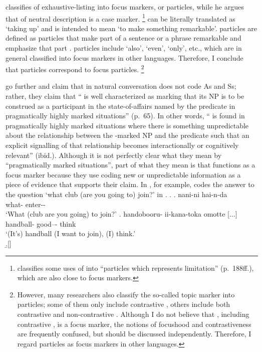  classifies  of exhaustive-listing into focus markers, or  particles,
while he argues that  of neutral description is a case marker.%
 \footnote{
  classifies some uses of  into ``particles which represents limitation'' (p.~188ff.),
 which are also close to focus markers.
 }
 can be literally translated as `taking up'
and is intended to mean `to make something remarkable'.
 particles are defined as
particles that make part of a sentence or a phrase remarkable and emphasize that part \cite[178]{miyata48}.
 particles include  `also',  `even',
 `only', etc.,
which are in general classified into focus markers in other languages.
Therefore, I conclude that  particles correspond to
focus particles.%
 \footnote{
 However, many researchers also classify the so-called topic marker 
  into  particles;
 some of them only include contrastive   \cite{okutsu74,okutsu86,numata86},
 others include both contrastive and non-contrastive 
 \cite{miyata48,suzuki72,teramura81,noda95}.
 Although I do not believe that , including contrastive , is a focus marker,
 the notions of focushood and contrastiveness are frequently confused,
 but should be discussed independently.
 Therefore, I regard  particles as focus markers
 in other languages.}

 go further and claim that
 in natural conversation does not code As and Ss;
rather, they claim that
`` is well characterized as marking that its NP is to be construed as a participant in the state-of-affairs named by the predicate in pragmatically highly marked situations'' (p.~65).
In other words,
`` is found in pragmatically highly marked situations where
there is something unpredictable about the relationship between
the -marked NP and the predicate such that
an explicit signalling of that relationship becomes interactionally or cognitively relevant'' (ibid.).
Although it is not perfectly clear what they mean by
``pragmatically marked situations'',
part of what they mean is that
 functions as a focus marker
because they use  coding new or unpredictable information
as a piece of evidence that supports their claim.
In \Next[b], for example,
 codes the answer to the question
`what club (are you going to) join?' in \Next[a].
%
\ex.
 \ag. nani-ni hai-n-da \\
      what- enter-- \\
      `What (club are you going) to join?'
 \bg. handobooru- ii-kana-toka omotte [...] \\
      handball- good--- think \\
      `(It's) handball (I want to join), (I) think.' \\
 \b.[]     \hfill{\cite[70]{onoetal00}}


